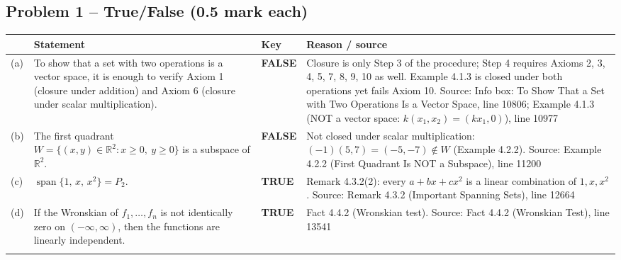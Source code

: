 \documentclass[11pt,a4paper]{article}
\newcommand{\Src}[1]{{\footnotesize\color{black!65}Source: #1}}
\begin{document}
\subsection*{Problem 1 -- True/False (0.5 mark each)}
\begin{tabularx}{\linewidth}{@{}l X l X@{}}\toprule & Statement & Key & Reason / source\\\midrule
(a) & To show that a set with two operations is a vector space, it is enough to verify Axiom 1 (closure under addition) and Axiom 6 (closure under scalar multiplication). & \textbf{FALSE} & Closure is only Step 3 of the procedure; Step 4 requires Axioms 2, 3, 4, 5, 7, 8, 9, 10 as well. Example 4.1.3 is closed under both operations yet fails Axiom 10. \Src{Info box: To Show That a Set with Two Operations Is a Vector Space, line 10806; Example 4.1.3 (NOT a vector space: $k(x_1,x_2)=(kx_1,0)$), line 10977}\\\addlinespace
(b) & The first quadrant $W=\{(x,y)\in\mathbb{R}^2 : x\ge 0,\ y\ge 0\}$ is a subspace of $\mathbb{R}^2$. & \textbf{FALSE} & Not closed under scalar multiplication: $(-1)(5,7)=(-5,-7)\notin W$ (Example 4.2.2). \Src{Example 4.2.2 (First Quadrant Is NOT a Subspace), line 11200}\\\addlinespace
(c) & $\operatorname{span}\{1,\,x,\,x^2\}=P_2$. & \textbf{TRUE} & Remark 4.3.2(2): every $a+bx+cx^2$ is a linear combination of $1,x,x^2$. \Src{Remark 4.3.2 (Important Spanning Sets), line 12664}\\\addlinespace
(d) & If the Wronskian of $f_1,\dots,f_n$ is not identically zero on $(-\infty,\infty)$, then the functions are linearly independent. & \textbf{TRUE} & Fact 4.4.2 (Wronskian test). \Src{Fact 4.4.2 (Wronskian Test), line 13541}\\\addlinespace
\bottomrule\end{tabularx}
\end{document}
